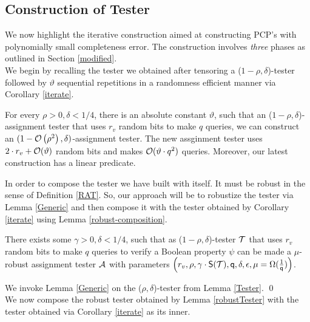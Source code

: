 \subsection{Construction of Tester}

We now highlight the iterative construction aimed at constructing
PCP's with polynomially small completeness error. The construction
involves {\em three} phases as outlined in Section \ref{modified}.\\

We begin by recalling the tester we obtained after tensoring a
($1 - \rho, \delta$)-tester followed by $\vartheta$ sequential repetitions in a
randomness efficient manner via Corollary \ref{iterate}.

\begin{col}
 For every $\rho > 0, \delta < 1/4$, there is an absolute constant
  $\vartheta$, such that an ($1 - \rho, \delta$)-assignment tester
  that uses $r_v$ random bits to make $q$ queries, we can construct an
  $(1 - {\cal O}\left(\rho^2\right) , {\delta})$-assignment
  tester. The new assginment tester uses $2 \cdot r_v + {\cal
    O}(\vartheta)$ random bits and makes ${\cal O}(\vartheta \cdot
  q^2)$ queries. Moreover, our latest construction has a linear
  predicate.
\end{col}

 In order to compose the tester we have
built with itself.  It must be robust in the sense of Definition
\ref{RAT}. So, our approach will be to robustize the tester via Lemma
\ref{Generic} and then compose it with the tester obtained by
Corollary \ref{iterate} using Lemma \ref{robust-composition}.

\begin{lemma}\label{robustTester}
  There exists some $\gamma > 0, \delta < 1/4$, such that as ($1 -
  \rho, \delta$)-tester ${\cal T}$ that uses $r_v$ random bits to make
  $q$ queries to verify a Boolean property $\psi$ can be made a
  $\mu$-robust assignment tester ${\cal A}$ with parameters
  $\left(r_v, \rho, \gamma \cdot {\sf S}({\cal T}), {\sf q}, \delta, \epsilon,
    \mu = \Omega(\frac{1}{{\sf q}})\right)$.
\end{lemma}
 We invoke Lemma \ref{Generic} on the
($\rho,\delta$)-tester from Lemma \ref{Tester}. \qed \\ 

 We now compose the robust tester
obtained by Lemma \ref{robustTester} with the tester obtained via
Corollary \ref{iterate} as its inner.

